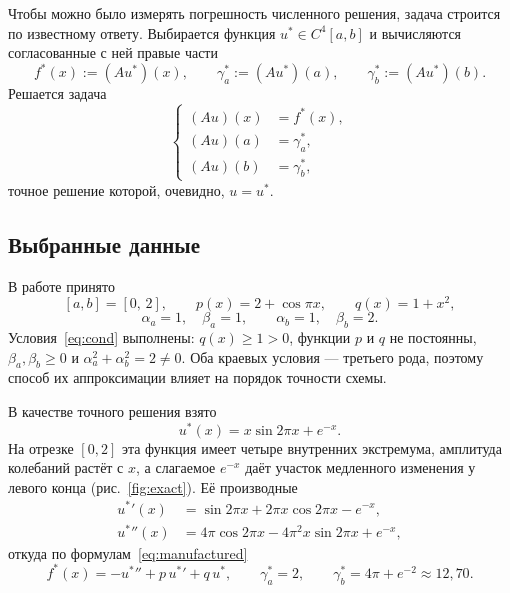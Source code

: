 \documentclass[12pt,a4paper]{article}
\begin{document}
Чтобы можно было измерять погрешность численного решения, задача
строится по известному ответу. Выбирается функция $u^*\in C^4[a,b]$ и
вычисляются согласованные с ней правые части
\begin{equation}\label{eq:manufactured}
f^*(x):=(Au^*)(x),\qquad
\gamma^*_a:=(Au^*)(a),\qquad
\gamma^*_b:=(Au^*)(b).
\end{equation}
Решается задача
\begin{equation}\label{eq:test}
\left\{
\begin{aligned}
(Au)(x) &= f^*(x),\\
(Au)(a) &= \gamma^*_a,\\
(Au)(b) &= \gamma^*_b,
\end{aligned}
\right.
\end{equation}
точное решение которой, очевидно, $u=u^*$.

\subsection{Выбранные данные}

В работе принято
\begin{equation}\label{eq:data}
[a,b]=[0,\,2],\qquad
p(x)=2+\cos\pi x,\qquad
q(x)=1+x^2,
\end{equation}
\begin{equation}\label{eq:bc}
\alpha_a=1,\quad \beta_a=1,\qquad
\alpha_b=1,\quad \beta_b=2 .
\end{equation}
Условия~\eqref{eq:cond} выполнены: $q(x)\ge 1>0$, функции $p$ и $q$ не
постоянны, $\beta_a,\beta_b\ge 0$ и $\alpha_a^2+\alpha_b^2=2\neq 0$.
Оба краевых условия --- третьего рода, поэтому способ их аппроксимации
влияет на порядок точности схемы.

В качестве точного решения взято
\begin{equation}\label{eq:ustar}
u^*(x)=x\sin 2\pi x + e^{-x}.
\end{equation}
На отрезке $[0,2]$ эта функция имеет четыре внутренних экстремума,
амплитуда колебаний растёт с $x$, а слагаемое $e^{-x}$ даёт участок
медленного изменения у левого конца (рис.~\ref{fig:exact}). Её
производные
\begin{align}
{u^*}'(x)  &= \sin 2\pi x + 2\pi x\cos 2\pi x - e^{-x},\\
{u^*}''(x) &= 4\pi\cos 2\pi x - 4\pi^2 x\sin 2\pi x + e^{-x},
\end{align}
откуда по формулам~\eqref{eq:manufactured}
\[
f^*(x)=-{u^*}''+p\,{u^*}'+q\,u^*,\qquad
\gamma^*_a=2,\qquad
\gamma^*_b=4\pi+e^{-2}\approx 12{,}70 .
\]
\end{document}
